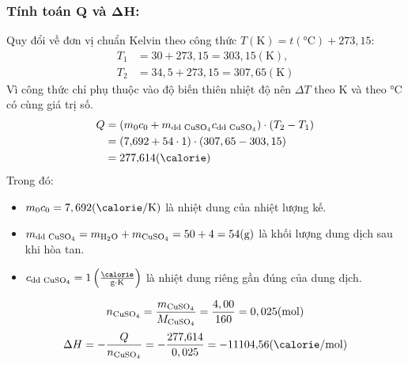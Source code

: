     \subsubsection{Tính toán \(\mathbf{Q}\) và \(\mathbf{\Delta H}\):}
        Quy đổi về đơn vị chuẩn Kelvin theo công thức \(T(\si{\kelvin}) = t(\si{\celsius}) + 273,15\):
        \begin{equation}
            \begin{aligned}
                T_1 &= 30 + 273,15 = 303,15 (\si{\kelvin}),\\
                T_2 &= 34,5 + 273,15 = 307,65 (\si{\kelvin})
            \end{aligned}
        \end{equation}
        Vì công thức chỉ phụ thuộc vào độ biến thiên nhiệt độ nên \(\Delta T\) theo \si{\kelvin} và theo \si{\celsius} có cùng giá trị số.
        \begin{equation}
            \begin{aligned}
                Q &= (m_0c_0 + m_{\text{dd }\ce{CuSO4}}c_{\text{dd }\ce{CuSO4}}) \cdot (T_2 - T_1) \\
                &= (7{,}692 + 54 \cdot 1) \cdot (307,65 - 303,15) \\
                &= 277{,}614 (\si{\calorie})
            \end{aligned}
        \end{equation}
        Trong đó:
        \begin{itemize}
            \item \(m_0c_0 = 7,692 (\si{\calorie} / \si{\kelvin})\) là nhiệt dung của nhiệt lượng kế.
            \item \(m_{\text{dd }\ce{CuSO4}} = m_{\ce{H2O}} + m_{\ce{CuSO4}} = 50 + 4 = 54 (\si{\gram})\) là khối lượng dung dịch sau khi hòa tan.
            \item \(c_{\text{dd }\ce{CuSO4}} = 1 \left(\frac{\si{\calorie}}{\si{\gram} \cdot \si{\kelvin}}\right)\) là nhiệt dung riêng gần đúng của dung dịch.
        \end{itemize}
        \begin{equation}
            n_{\ce{CuSO4}} = \frac{m_{\ce{CuSO4}}}{M_{\ce{CuSO4}}} = \frac{4,00}{160} = 0,025 (\si{\mole})
        \end{equation}
        \begin{equation}
            \Delta H = - \frac{Q}{n_{\ce{CuSO4}}} = - \frac{277{,}614}{0,025} = -11104{,}56 (\si{\calorie} / \si{\mole})
        \end{equation}
